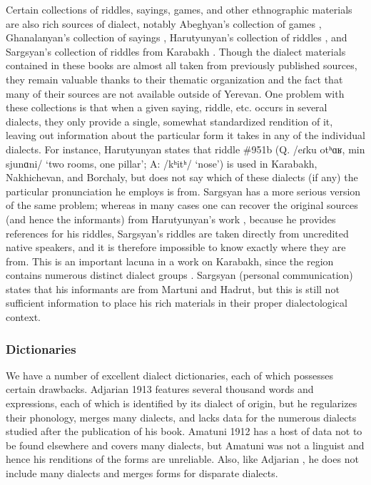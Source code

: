 \documentclass[output=paper]{langscibook}
\begin{document}
Certain collections of riddles, sayings, games, and other ethnographic materials are also rich sources of dialect, notably  Abeghyan's collection of games \citep{Abeghyan-1940-Games}, Ghanalanyan's collection of sayings \citep{Ghanalanyan-1960-Sayings}, Harutyunyan's collection of riddles \citep{Harutyunyan-1965-Riddles}, and Sargsyan's collection of riddles from Karabakh \citep{Sargsyan-2002-ArtsakhRiddles}.  Though the dialect materials contained in these books are almost all taken from previously published sources, they remain valuable thanks to their thematic organization and the fact that many of their sources are not available outside of Yerevan. One problem with these collections is that when a given saying, riddle, etc. occurs in several dialects, they only provide a single, somewhat standardized rendition of it, leaving out information about the particular form it takes in any of the individual dialects. For instance,  Harutyunyan \citep{Harutyunyan-1965-Riddles} states that riddle \#951b (Q. /eɾku otʰɑʁ, min sjunɑni/ `two rooms, one pillar'; A: /kʰitʰ/ `nose') is used in Karabakh, Nakhichevan, and Borchaly,  but does not say which of these dialects (if any) the particular pronunciation he employs is from. Sargsyan \citep{Sargsyan-2002-ArtsakhRiddles}  has a more serious version of the same problem; whereas in many cases one can recover the original sources (and hence the informants) from Harutyunyan's work \citep{Harutyunyan-1965-Riddles}, because he provides references for his riddles, Sargsyan's riddles are taken directly from uncredited native speakers, and it is therefore impossible to know exactly where they are from. This is an important lacuna in a work on Karabakh, since the region contains numerous distinct dialect groups \citep{Davtyan-1966-KarabakhDialectMap}. Sargsyan (personal communication) states that his informants are from Martuni and Hadrut, but this is still not sufficient information to place his rich materials in their proper dialectological context.

\subsubsection{Dictionaries}\label{sec:vaux:documentation:arm:dict}

We have a number of excellent dialect dictionaries, each of which possesses certain drawbacks. Adjarian 1913 \citep{Adjarian-1913-DialectalDictionary}  features several thousand words and expressions, each of which is identified by its dialect of origin, but he regularizes their phonology, merges many dialects, and lacks data for the numerous dialects studied after the publication of his book.  Amatuni 1912 \citep{Amatun-1912-ArmenianWord} has a host of data not to be found elsewhere and covers many dialects, but Amatuni was not a linguist and hence his renditions of the forms are unreliable. Also, like Adjarian \citeyear{Adjarian-1913-DialectalDictionary}, he does not include many dialects and merges forms for disparate dialects. 
\end{document}
